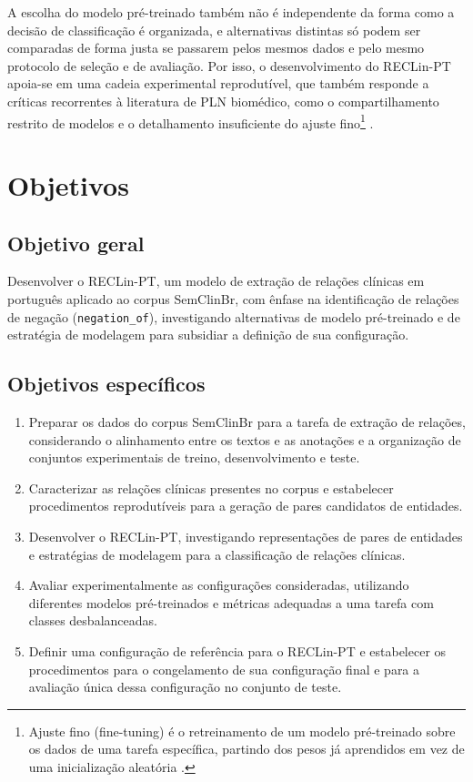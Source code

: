 A escolha do modelo pré-treinado também não é independente da forma como a decisão de
classificação é organizada, e alternativas distintas só podem ser comparadas de forma
justa se passarem pelos mesmos dados e pelo mesmo protocolo de seleção e de
avaliação. Por isso, o desenvolvimento do RECLin-PT apoia-se em uma cadeia
experimental reprodutível, que também responde a críticas recorrentes à literatura
de PLN biomédico, como o compartilhamento restrito de modelos e o detalhamento
insuficiente do ajuste fino\footnote{Ajuste fino (\foreignlanguage{english}{fine-tuning})
é o retreinamento de um modelo pré-treinado sobre os dados de uma tarefa específica,
partindo dos pesos já aprendidos em vez de uma inicialização aleatória
\cite{devlin_2019_bert}.} \cite{navarro_2023_revisao,shimaoka_2026_revisao}.

\section{Objetivos}

\subsection{Objetivo geral}

Desenvolver o RECLin-PT, um modelo de extração de relações clínicas em português
aplicado ao corpus SemClinBr, com ênfase na identificação de relações de negação
(\texttt{negation\_of}), investigando alternativas de modelo pré-treinado e de
estratégia de modelagem para subsidiar a definição de sua configuração.

\subsection{Objetivos específicos}

\begin{enumerate}
  \item Preparar os dados do corpus SemClinBr para a tarefa de extração de relações,
        considerando o alinhamento entre os textos e as anotações e a organização de
        conjuntos experimentais de treino, desenvolvimento e teste.
  \item Caracterizar as relações clínicas presentes no corpus e estabelecer
        procedimentos reprodutíveis para a geração de pares candidatos de entidades.
  \item Desenvolver o RECLin-PT, investigando representações de pares de entidades e
        estratégias de modelagem para a classificação de relações clínicas.
  \item Avaliar experimentalmente as configurações consideradas, utilizando
        diferentes modelos pré-treinados e métricas adequadas a uma tarefa com
        classes desbalanceadas.
  \item Definir uma configuração de referência para o RECLin-PT e estabelecer os
        procedimentos para o congelamento de sua configuração final e para a
        avaliação única dessa configuração no conjunto de teste.
\end{enumerate}

